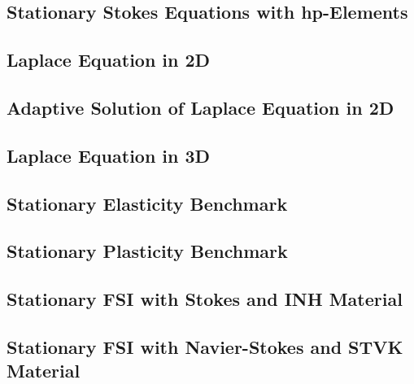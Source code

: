 \documentclass[a4paper,cleardoubleempty]{scrreprt}
\theoremstyle{plain}
\theoremstyle{remark}
\begin{document}
\subsection{Stationary Stokes Equations with hp-Elements} 
\label{PDE_Stat_Stokes_hp}

\clearpage
\subsection{Laplace Equation in 2D} 
\label{PDE_Stat_Laplace_2D}

\clearpage
\subsection{Adaptive Solution of Laplace Equation in 2D}
\label{PDE_adap_Stat_Laplace}

\clearpage
\subsection{Laplace Equation in 3D}
\label{PDE_Stat_Laplace_3D}

\clearpage
\subsection{Stationary Elasticity Benchmark} 
\label{PDE_Stat_Elasticity}

\clearpage
\subsection{Stationary Plasticity Benchmark} 
\label{PDE_Stat_Plasticity}

\clearpage
\subsection{Stationary FSI with Stokes and INH Material} 
\label{PDE_Stat_FSI_INH}

\clearpage
\subsection{Stationary FSI with Navier-Stokes and STVK Material} 
\label{PDE_Stat_FSI_STVK}

\clearpage
\end{document}
